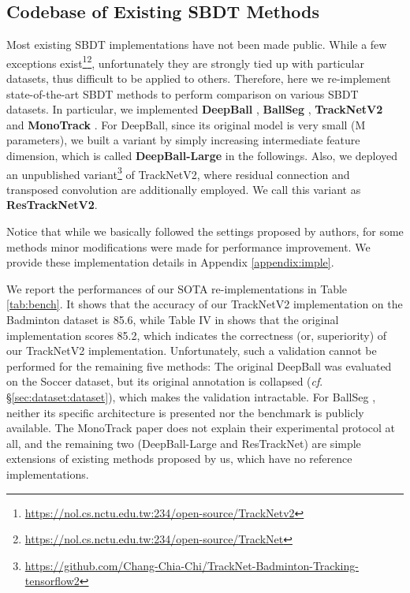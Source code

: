 \documentclass{bmvc2k}
\begin{document}
\subsection{Codebase of Existing SBDT Methods}
\label{sec:eval:baseline}
Most existing SBDT implementations have not been made public.
While a few exceptions exist\footnote{\url{https://nol.cs.nctu.edu.tw:234/open-source/TrackNetv2}}\footnote{\url{https://nol.cs.nctu.edu.tw:234/open-source/TrackNet}}, unfortunately they are strongly tied up with particular datasets, thus difficult to be applied to others.
Therefore, here we re-implement state-of-the-art SBDT methods to perform comparison on various SBDT datasets.
In particular, we implemented \textbf{DeepBall} \cite{komorowski+2019mva,komorowski+2020visapp}, \textbf{BallSeg} \cite{zandycke+2019mmsports}, \textbf{TrackNetV2} \cite{sun+2020icpai} and \textbf{MonoTrack} \cite{liu+2022cvprw}.
For DeepBall, since its original model is very small (M parameters), we built a variant by simply increasing intermediate feature dimension, which is called \textbf{DeepBall-Large} in the followings.
Also, we deployed an unpublished variant\footnote{\url{https://github.com/Chang-Chia-Chi/TrackNet-Badminton-Tracking-tensorflow2}} of TrackNetV2, where residual connection and transposed convolution are additionally employed.
We call this variant as \textbf{ResTrackNetV2}.
\par
Notice that while we basically followed the settings proposed by authors, for some methods minor modifications were made for performance improvement.
We provide these implementation details in Appendix \ref{appendix:imple}.
\par
We report the performances of our SOTA re-implementations in Table \ref{tab:bench}.
It shows that the accuracy of our TrackNetV2 \cite{sun+2020icpai} implementation on the Badminton dataset is 85.6, while Table IV in \cite{sun+2020icpai} shows that the original implementation scores 85.2, which indicates the correctness (or, superiority) of our TrackNetV2 implementation.
Unfortunately, such a validation cannot be performed for the remaining five methods:
The original DeepBall \cite{komorowski+2019visapp} was evaluated on the Soccer dataset, but its original annotation is collapsed ({\it cf}. \S \ref{sec:dataset:dataset}), which makes the validation intractable.
For BallSeg \cite{zandycke+2019mmsports}, neither its specific architecture is presented nor the benchmark is publicly available.
The MonoTrack paper \cite{liu+2022cvprw} does not explain their experimental protocol at all, and the remaining two (DeepBall-Large and ResTrackNet) are simple extensions of existing methods proposed by us, which have no reference implementations.
\end{document}
